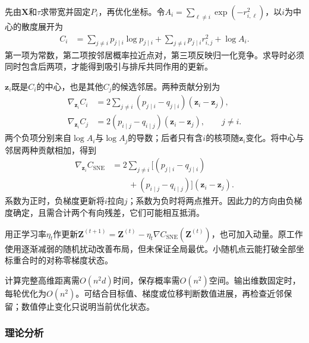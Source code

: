 先由$\bm{X}$和$\tau$求带宽并固定$P_i$，再优化坐标。令$A_i=\sum_{\ell\ne i}\exp(-r_{i,\ell}^2)$，以$i$为中心的散度展开为
\begin{equation}
  \label{eq:dim-sne-anchor-loss}
  \begin{aligned}
    C_i&=\sum_{j\ne i}p_{j\mid i}\log p_{j\mid i}
      +\sum_{j\ne i}p_{j\mid i}r_{i,j}^2+\log A_i.
  \end{aligned}
\end{equation}
第一项为常数，第二项按邻居概率拉近点对，第三项反映归一化竞争。求导时必须同时包含后两项，才能得到吸引与排斥共同作用的更新。

$\bm{z}_i$既是$C_i$的中心，也是其他$C_j$的候选邻居。两种贡献分别为
\begin{equation}
  \label{eq:dim-sne-two-roles}
  \begin{aligned}
    \nabla_{\bm{z}_i}C_i
      &=2\sum_{j\ne i}(p_{j\mid i}-q_{j\mid i})
        (\bm{z}_i-\bm{z}_j),\\
    \nabla_{\bm{z}_i}C_j
      &=2(p_{i\mid j}-q_{i\mid j})
        (\bm{z}_i-\bm{z}_j),\qquad j\ne i.
  \end{aligned}
\end{equation}
两个负项分别来自$\log A_i$与$\log A_j$的导数；后者只有含$i$的核项随$\bm{z}_i$变化。将中心与邻居两种贡献相加，得到
\begin{equation}
  \label{eq:dim-sne-gradient}
  \begin{aligned}
    \nabla_{\bm{z}_i}C_{\mathrm{SNE}}
      &=2\sum_{j\ne i}
        \bigl[(p_{j\mid i}-q_{j\mid i})\\
      &\qquad +(p_{i\mid j}-q_{i\mid j})\bigr]
        (\bm{z}_i-\bm{z}_j).
  \end{aligned}
\end{equation}
系数为正时，负梯度更新将$i$拉向$j$；系数为负时将两点推开。因此力的方向由负梯度确定，且需合计两个有向残差，它们可能相互抵消。

用正学习率$\eta_t$作更新$\bm{Z}^{(t+1)}=\bm{Z}^{(t)}-\eta_t\nabla C_{\mathrm{SNE}}(\bm{Z}^{(t)})$，也可加入动量。原工作使用逐渐减弱的随机扰动改善布局，但未保证全局最优。小随机点云能打破全部坐标重合时的对称零梯度状态。

计算完整高维距离需$O(n^2d)$时间，保存概率需$O(n^2)$空间。输出维数固定时，每轮优化为$O(n^2)$。可结合目标值、梯度或位移判断数值进展，再检查近邻保留；数值停止变化只说明当前优化状态。

\subsubsection{理论分析}
\label{sec:dim-sne-theory}

